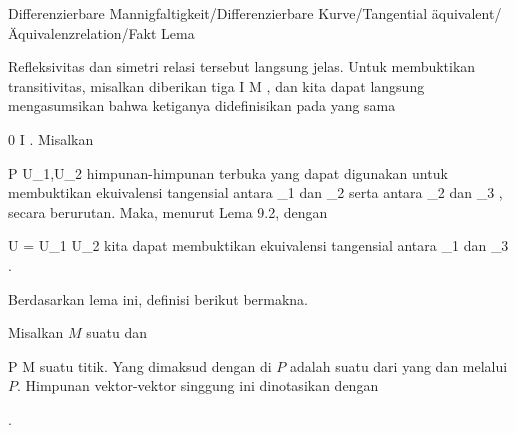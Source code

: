 {Differenzierbare Mannigfaltigkeit/Differenzierbare Kurve/Tangential äquivalent/Äquivalenzrelation/Fakt}
{Lema}
{}
{

\faktzusatz {}
\faktzusatz {}

}
{

Refleksivitas dan simetri relasi tersebut langsung jelas. Untuk membuktikan transitivitas, misalkan diberikan tiga
 { I } { M
} {}
,
dan kita dapat langsung mengasumsikan bahwa ketiganya didefinisikan pada
yang sama

\mavergleichskette
{\vergleichskette
{ 0
}
{ \in }{ I
}
{ \subseteq }{\R
}
{    }{
}
{   }{
}
}
{}{}{}
.
Misalkan

\mavergleichskette
{\vergleichskette
{P
}
{ \in }{ U_1,U_2
}
{  }{
}
{    }{
}
{   }{
}
}
{}{}{}
himpunan-himpunan terbuka yang dapat digunakan untuk membuktikan ekuivalensi tangensial antara
\mathkor {} {\gamma_1} {dan} {\gamma_2} {}
serta antara
\mathkor {} {\gamma_2} {dan} {\gamma_3} {}
,
secara berurutan. Maka, menurut
Lema 9.2,
dengan

\mavergleichskette
{\vergleichskette
{U
}
{ = }{ U_1 \cap U_2
}
{  }{
}
{    }{
}
{   }{
}
}
{}{}{}
kita dapat membuktikan ekuivalensi tangensial antara
\mathkor {} {\gamma_1} {dan} {\gamma_3} {}
.

}

Berdasarkan lema ini, definisi berikut bermakna.

{}
{

Misalkan $M$ suatu
dan

\mavergleichskette
{\vergleichskette
{ P
}
{ \in }{ M
}
{  }{
}
{    }{
}
{   }{
}
}
{}{}{}
suatu titik. Yang dimaksud dengan  di $P$ adalah suatu
dari
yang
dan melalui $P$. Himpunan vektor-vektor singgung ini dinotasikan dengan

 {  }

.

}



